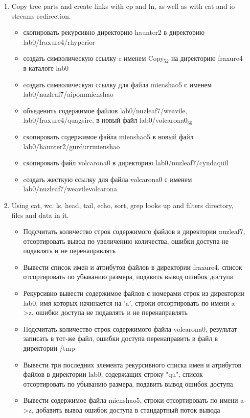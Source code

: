 \documentclass[11pt]{article}
\begin{document}
\begin{enumerate}
\begin{itemize}
\end{itemize}
\item Copy tree parts and create links with cp and ln, as well as with cat and io streams redirection.
\begin{itemize}
\item скопировать рекурсивно директорию haunter2 в директорию lab0/fraxure4/rhyperior
\item создать символическую ссылку c именем Copy\(_{\text{52}}\) на директорию fraxure4 в каталоге lab0
\item cоздать символическую ссылку для файла mienshao5 с именем lab0/nuzleaf7/aipommienshao
\item объеденить содержимое файлов lab0/nuzleaf7/weavile, lab0/fraxure4/quagsire, в новый файл lab0/volcarona0\(_{\text{66}}\)
\item скопировать содержимое файла mienshao5 в новый файл lab0/haunter2/gurdurrmienshao
\item скопировать файл volcarona0 в директорию lab0/nuzleaf7/cyndaquil
\item cоздать жесткую ссылку для файла volcarona0 с именем lab0/nuzleaf7/weavilevolcarona
\end{itemize}
\item Using cat, wc, ls, head, tail, echo, sort, grep looks up and filters directory, files and data in it.
\begin{itemize}
\item Подсчитать количество строк содержимого файлов в директории nuzleaf7, отсортировать вывод по увеличению количества, ошибки доступа не подавлять и не перенаправлять
\item Вывести список имен и атрибутов файлов в директории fraxure4, список отсортировать по убыванию размера, подавить вывод ошибок доступа
\item Рекурсивно вывести содержимое файлов с номерами строк из директории lab0, имя которых начинается на 'a', строки отсортировать по имени a->z, ошибки доступа не подавлять и не перенаправлять
\item Подсчитать количество строк содержимого файла volcarona0, результат записать в тот-же файл, ошибки доступа перенаправить в файл в директории /tmp
\item Вывести три последних элемента рекурсивного списка имен и атрибутов файлов в директории lab0, содержащих строку "qu", список отсортировать по убыванию размера, подавить вывод ошибок доступа
\item Вывести содержимое файла mienshao5, строки отсортировать по имени a->z, добавить вывод ошибок доступа в стандартный поток вывода

\end{itemize}
\end{enumerate}
\end{document}
